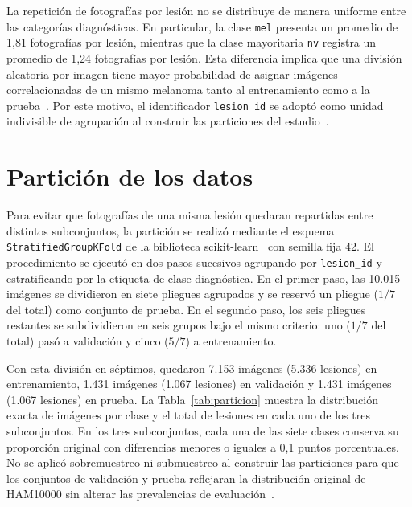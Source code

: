 La repetición de fotografías por lesión no se distribuye de manera uniforme entre las categorías diagnósticas. En particular, la clase \texttt{mel} presenta un promedio de 1,81 fotografías por lesión, mientras que la clase mayoritaria \texttt{nv} registra un promedio de 1,24 fotografías por lesión. Esta diferencia implica que una división aleatoria por imagen tiene mayor probabilidad de asignar imágenes correlacionadas de un mismo melanoma tanto al entrenamiento como a la prueba~\cite{abhishek2025quality}. Por este motivo, el identificador \texttt{lesion\_id} se adoptó como unidad indivisible de agrupación al construir las particiones del estudio~\cite{kapoor2023leakage,abhishek2025quality}.

\section{Partición de los datos}

Para evitar que fotografías de una misma lesión quedaran repartidas entre distintos subconjuntos, la partición se realizó mediante el esquema \texttt{StratifiedGroupKFold} de la biblioteca scikit-learn~\cite{pedregosa2011sklearn} con semilla fija 42. El procedimiento se ejecutó en dos pasos sucesivos agrupando por \texttt{lesion\_id} y estratificando por la etiqueta de clase diagnóstica. En el primer paso, las 10.015 imágenes se dividieron en siete pliegues agrupados y se reservó un pliegue ($1/7$ del total) como conjunto de prueba. En el segundo paso, los seis pliegues restantes se subdividieron en seis grupos bajo el mismo criterio: uno ($1/7$ del total) pasó a validación y cinco ($5/7$) a entrenamiento.

Con esta división en séptimos, quedaron 7.153 imágenes (5.336 lesiones) en entrenamiento, 1.431 imágenes (1.067 lesiones) en validación y 1.431 imágenes (1.067 lesiones) en prueba. La Tabla~\ref{tab:particion} muestra la distribución exacta de imágenes por clase y el total de lesiones en cada uno de los tres subconjuntos. En los tres subconjuntos, cada una de las siete clases conserva su proporción original con diferencias menores o iguales a 0,1 puntos porcentuales. No se aplicó sobremuestreo ni submuestreo al construir las particiones para que los conjuntos de validación y prueba reflejaran la distribución original de HAM10000 sin alterar las prevalencias de evaluación~\cite{maierhein2024metrics,kapoor2023leakage}.

